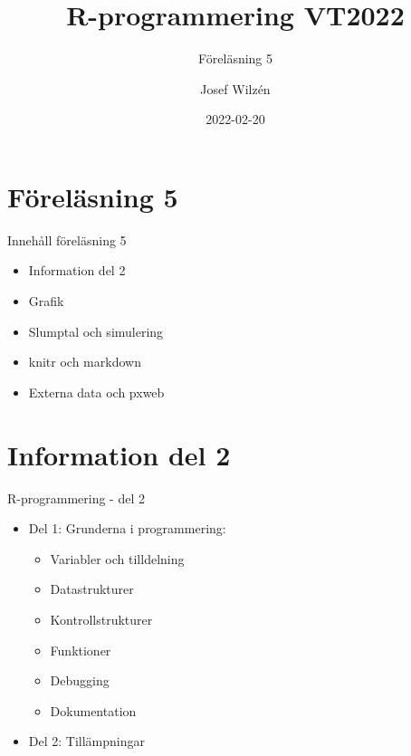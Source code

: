 \documentclass[
  11pt,
  ignorenonframetext,
  handout]{beamer}
\title{R-programmering VT2022}
\subtitle{Föreläsning 5}
\author{Josef Wilzén}
\date{2022-02-20}
\institute{Linköpings Universitet}
\providecommand{\tightlist}{%
  \setlength{\itemsep}{0pt}\setlength{\parskip}{0pt}}
\begin{document}
\frame{\titlepage}

\hypertarget{fuxf6reluxe4sning-5}{%
\section{Föreläsning 5}\label{fuxf6reluxe4sning-5}}

\begin{frame}{Innehåll föreläsning 5}
\protect\hypertarget{innehuxe5ll-fuxf6reluxe4sning-5}{}
\begin{itemize}
\tightlist
\item
  Information del 2
\item
  Grafik
\item
  Slumptal och simulering
\item
  knitr och markdown
\item
  Externa data och pxweb
\end{itemize}
\end{frame}

\hypertarget{information-del-2}{%
\section{Information del 2}\label{information-del-2}}

\begin{frame}{R-programmering - del 2}
\protect\hypertarget{r-programmering---del-2}{}
\begin{itemize}
\tightlist
\item
  Del 1: Grunderna i programmering:

  \begin{itemize}
  \tightlist
  \item
    Variabler och tilldelning
  \item
    Datastrukturer
  \item
    Kontrollstrukturer
  \item
    Funktioner
  \item
    Debugging
  \item
    Dokumentation
  \end{itemize}
\item
  Del 2: Tillämpningar
\end{itemize}
\end{frame}
\end{document}
